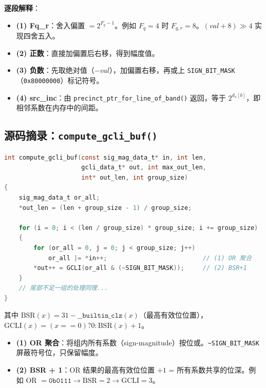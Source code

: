 \begin{engineeringnote}
\textbf{逐段解释}：
\begin{itemize}
  \item \textbf{(1) Fq\_r}：舍入偏置 $= 2^{F_q-1}$。例如 $F_q = 4$ 时 $F_{q,r} = 8$。$(val + 8) \gg 4$ 实现四舍五入。
  \item \textbf{(2) 正数}：直接加偏置后右移，得到幅度值。
  \item \textbf{(3) 负数}：先取绝对值（$-val$），加偏置右移，再或上 \texttt{SIGN\_BIT\_MASK}（\texttt{0x80000000}）标记符号。
  \item \textbf{(4) src\_inc}：由 \texttt{precinct\_ptr\_for\_line\_of\_band()} 返回，等于 $2^{d_x[b]}$，即相邻系数在内存中的间距。
\end{itemize}
\end{engineeringnote}

\subsection{源码摘录：\texttt{compute\_gcli\_buf()}}

\begin{lstlisting}[language=C,numbers=none]
int compute_gcli_buf(const sig_mag_data_t* in, int len,
                     gcli_data_t* out, int max_out_len,
                     int* out_len, int group_size)
{
    sig_mag_data_t or_all;
    *out_len = (len + group_size - 1) / group_size;

    for (i = 0; i < (len / group_size) * group_size; i += group_size)
    {
        for (or_all = 0, j = 0; j < group_size; j++)
            or_all |= *in++;                          // (1) OR 聚合
        *out++ = GCLI(or_all & (~SIGN_BIT_MASK));     // (2) BSR+1
    }
    // 尾部不足一组的处理同理...
}
\end{lstlisting}

\begin{engineeringnote}
其中 $\text{BSR}(x) = 31 - \texttt{\_\_builtin\_clz}(x)$（最高有效位位置），$\text{GCLI}(x) = (x{=}{=}0) ? 0 : \text{BSR}(x)+1$。
\begin{itemize}
  \item \textbf{(1) OR 聚合}：将组内所有系数（sign-magnitude）按位或。\texttt{\~{}SIGN\_BIT\_MASK} 屏蔽符号位，只保留幅度。
  \item \textbf{(2) BSR + 1}：OR 结果的最高有效位位置 $+ 1$ = 所有系数共享的位深。例如 OR $= \texttt{0b0111} \to \text{BSR} = 2 \to \text{GCLI} = 3$。
\end{itemize}
\end{engineeringnote}

